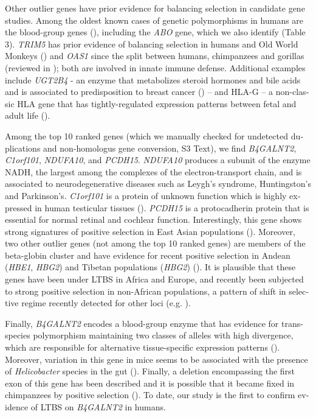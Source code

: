 \begin{refsection}
\begin{otherlanguage}{english}
Other outlier genes have prior evidence for balancing selection in candidate gene studies. Among the oldest known cases of genetic polymorphisms in humans are the blood-group genes (\cite{Segurel2012,Segurel2013}), including the \emph{ABO} gene, which we also identify (Table 3). \emph{TRIM5} has prior evidence of balancing selection in humans and Old World Monkeys (\cite{Cagliani2010}) and \emph{OAS1} since the split between humans, chimpanzees and gorillas (reviewed in \cite{Fijarczyk2015}); both are involved in innate immune defense. Additional examples include \emph{UGT2B4} - an enzyme that metabolizes steroid hormones and bile acids and is associated to predisposition to breast cancer (\cite{Sun2011}) – and HLA-G – a non-classic HLA gene that has tightly-regulated expression patterns between fetal and adult life (\cite{Tan2005}).

Among the top 10 ranked genes (which we manually checked for undetected duplications and non-homologus gene conversion, S3 Text), we find \emph{B4GALNT2}, \emph{C1orf101}, \emph{NDUFA10}, and \emph{PCDH15}. \emph{NDUFA10} produces a subunit of the enzyme NADH, the largest among the complexes of the
electron-transport chain, and is associated to neurodegenerative diseases such as Leygh’s syndrome, Huntingston’s and Parkinson’s. \emph{C1orf101} is a protein of unknown function which is highly expressed in human testicular tissues (\cite{Petit2015}). \emph{PCDH15} is a protocadherin protein that is essential for normal retinal and cochlear function. Interestingly, this gene shows strong signatures of positive selection in East Asian populations
(\cite{Sabeti2007}). Moreover, two other outlier genes (not among the top 10 ranked genes) are members of the beta-globin cluster and have evidence for recent positive selection in Andean (\emph{HBE1}, \emph{HBG2}) and Tibetan populations (\emph{HBG2}) (\cite{Bigham2010,ROTTGARDT2010,Yi2010}). It is plausible that these genes have been under LTBS in Africa and Europe, and recently been subjected to strong positive selection in non-African populations, a pattern of shift in selective regime recently detected for other loci (e.g. \cite{DeFilippo2016}).

Finally, \emph{B4GALNT2} encodes a blood-group enzyme that has evidence for trans-species polymorphism maintaining two classes of alleles with high divergence, which are responsible for alternative tissue-specific expression patterns (\cite{Linnenbrink2011}). Moreover, variation in this gene in mice seems to be associated with the presence of \emph{Helicobacter} species in the gut (\cite{Staubach2012,Segurel2013}). Finally, a deletion encompassing the first exon of this gene has been described and it is possible that it became fixed in chimpanzees by positive selection (\cite{Perry2008}). To date, our study is the first to confirm evidence of LTBS on \emph{B4GALNT2}  in humans.

\end{otherlanguage}
\end{refsection}

